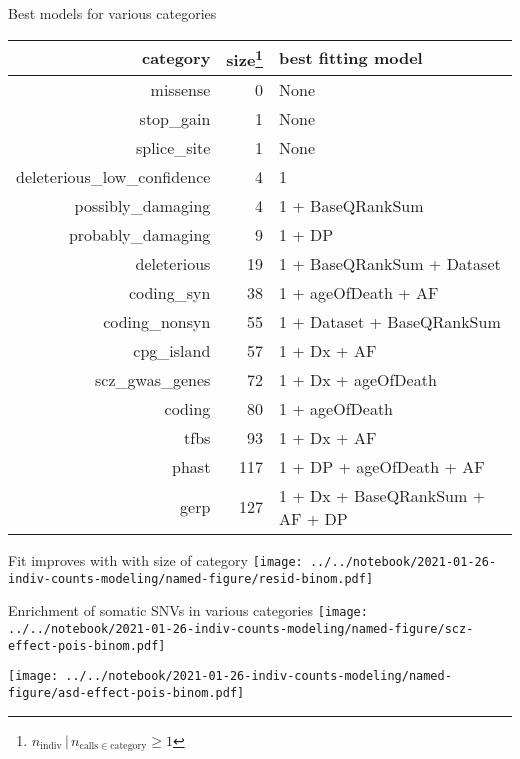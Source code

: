 \documentclass[usenames,dvipsnames]{beamer}
\begin{document}
\begin{frame}{Best models for various categories}
\begin{center}
\tiny
\begin{tabular}{rrl}
\hline
category  & size\footnote{\(n_\mathrm{indiv} \,|\, n_{\mathrm{calls} \in
			\mathrm{category}} \ge 1\)} & best fitting model  \\
\hline
missense  & 0 & None  \\
stop\_gain  & 1 & None  \\
splice\_site  & 1 & None  \\
deleterious\_low\_confidence  & 4 & 1 \\
possibly\_damaging  & 4 & 1 + BaseQRankSum  \\
probably\_damaging  & 9 & 1 + DP  \\
deleterious  & 19 & 1 + BaseQRankSum + Dataset  \\
coding\_syn  & 38 & 1 + ageOfDeath + AF  \\
coding\_nonsyn  & 55 & 1 + Dataset + BaseQRankSum  \\
cpg\_island  & 57 & 1 + Dx + AF  \\
scz\_gwas\_genes  & 72 & 1 + Dx + ageOfDeath  \\
coding  & 80 & 1 + ageOfDeath  \\
tfbs  & 93 & 1 + Dx + AF  \\
phast  & 117 & 1 + DP + ageOfDeath + AF  \\
gerp  & 127 & 1 + Dx + BaseQRankSum + AF + DP  \\
\hline
\end{tabular}
\end{center}
\end{frame}

\begin{frame}{Fit improves with with size of category}
\texttt{[image: ../../notebook/2021-01-26-indiv-counts-modeling/named-figure/resid-binom.pdf]}
\end{frame}

\begin{frame}{Enrichment of somatic SNVs in various categories}
\texttt{[image: ../../notebook/2021-01-26-indiv-counts-modeling/named-figure/scz-effect-pois-binom.pdf]}

\texttt{[image: ../../notebook/2021-01-26-indiv-counts-modeling/named-figure/asd-effect-pois-binom.pdf]}
\end{frame}
\end{document}

